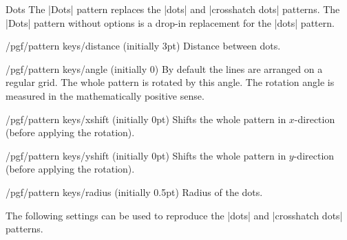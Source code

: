 \begin{pattern}{Dots}
    The |Dots| pattern replaces the |dots| and |crosshatch dots| patterns. The
    |Dots| pattern without options is a drop-in replacement for the |dots|
    pattern.
    \begin{key}{/pgf/pattern keys/distance (initially 3pt)}
        Distance between dots.
    \end{key}
    \begin{key}{/pgf/pattern keys/angle (initially 0)}
        By default the lines are arranged on a regular grid. The whole pattern
        is rotated by this angle. The rotation angle is measured in the
        mathematically positive sense.
    \end{key}
    \begin{key}{/pgf/pattern keys/xshift (initially 0pt)}
        Shifts the whole pattern in $x$-direction (before applying the
        rotation).
    \end{key}
    \begin{key}{/pgf/pattern keys/yshift (initially 0pt)}
        Shifts the whole pattern in $y$-direction (before applying the
        rotation).
    \end{key}
    \begin{key}{/pgf/pattern keys/radius (initially 0.5pt)}
        Radius of the dots.
    \end{key}
    The following settings can be used to reproduce the |dots| and
    |crosshatch dots| patterns.
\begin{codeexample}[preamble={\usetikzlibrary{patterns.meta}}]
\end{codeexample}
\end{pattern}

